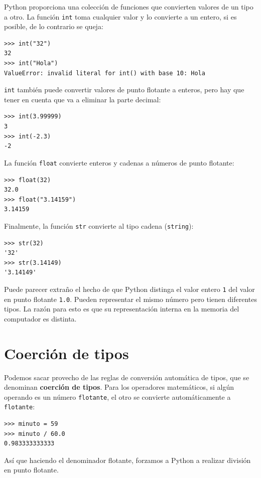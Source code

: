  

Python proporciona una colección de funciones que convierten valores
de un tipo a otro. La función \texttt{int} toma cualquier valor y
lo convierte a un entero, si es posible, de lo contrario se queja:

\begin{lstlisting}
>>> int("32")
32
>>> int("Hola")
ValueError: invalid literal for int() with base 10: Hola
\end{lstlisting}
 \texttt{int} también puede convertir valores de punto flotante a
enteros, pero hay que tener en cuenta que va a eliminar la parte decimal:

\begin{lstlisting}
>>> int(3.99999)
3
>>> int(-2.3)
-2
\end{lstlisting}
 La función \texttt{float} convierte enteros y cadenas a números de
punto flotante:

\begin{lstlisting}
>>> float(32)
32.0
>>> float("3.14159")
3.14159
\end{lstlisting}
 Finalmente, la función \texttt{str} convierte al tipo cadena (\texttt{string}):

\begin{lstlisting}
>>> str(32)
'32'
>>> str(3.14149)
'3.14149'
\end{lstlisting}
 Puede parecer extraño el hecho de que Python distinga el valor entero
\texttt{1} del valor en punto flotante \texttt{1.0}. Pueden representar
el mismo número pero tienen diferentes tipos. La razón para esto es
que su representación interna en la memoria del computador es distinta.

\section{Coerción de tipos}

  

Podemos sacar provecho de las reglas de conversión automática de tipos,
que se denominan \textbf{coerción de tipos}. Para los operadores matemáticos,
si algún operando es un número \texttt{flotante}, el otro se convierte
automáticamente a \texttt{flotante}:

\begin{lstlisting}
>>> minuto = 59
>>> minuto / 60.0
0.983333333333
\end{lstlisting}
Así que haciendo el denominador flotante, forzamos a Python a realizar
división en punto flotante.

